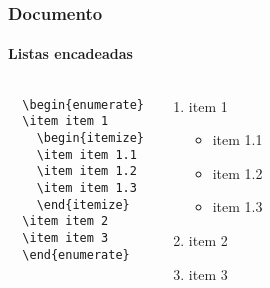 \begin{frame}[fragile]
\frametitle{Documento}
\framesubtitle{Listas encadeadas}
  \scriptsize
  \begin{columns}[c]
  \begin{verbatim}
  \begin{enumerate}
  \item item 1
    \begin{itemize}
    \item item 1.1
    \item item 1.2
    \item item 1.3
    \end{itemize}
  \item item 2
  \item item 3
  \end{enumerate}
  \end{verbatim}
  \begin{fmpage}{\textwidth}
  \begin{enumerate}
  \item item 1
    \begin{itemize}
    \item item 1.1
    \item item 1.2
    \item item 1.3
    \end{itemize}
  \item item 2
  \item item 3
  \end{enumerate}
  \end{fmpage}
  \end{columns}
\end{frame}


